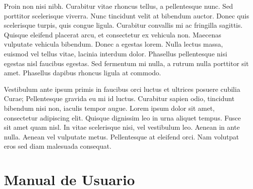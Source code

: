 \documentclass{pfc}
\begin{document}
Proin non nisi nibh. Curabitur vitae rhoncus tellus, a pellentesque
nunc. Sed porttitor scelerisque viverra. Nunc tincidunt velit at
bibendum auctor. Donec quis scelerisque turpis, quis congue
ligula. Curabitur convallis mi ac fringilla sagittis. Quisque eleifend
placerat arcu, et consectetur ex vehicula non. Maecenas vulputate
vehicula bibendum. Donec a egestas lorem. Nulla lectus massa, euismod
vel tellus vitae, lacinia interdum dolor. Phasellus pellentesque nisi
egestas nisl faucibus egestas. Sed fermentum mi nulla, a rutrum nulla
porttitor sit amet. Phasellus dapibus rhoncus ligula at commodo.

Vestibulum ante ipsum primis in faucibus orci luctus et ultrices
posuere cubilia Curae; Pellentesque gravida eu mi id luctus. Curabitur
sapien odio, tincidunt bibendum nisi non, iaculis tempor augue. Lorem
ipsum dolor sit amet, consectetur adipiscing elit. Quisque dignissim
leo in urna aliquet tempus. Fusce sit amet quam nisl. In vitae
scelerisque nisi, vel vestibulum leo. Aenean in ante nulla. Aenean vel
vulputate metus. Pellentesque at eleifend orci. Nam volutpat eros sed
diam malesuada consequat.



\appendix

\chapter{Manual de Usuario}
%



\backmatter

%
%

% 


%
%


\end{document}
